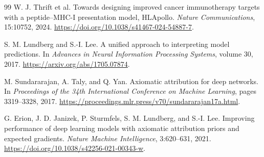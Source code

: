 \begin{thebibliography}{99}
W. J. Thrift et al.
\newblock Towards designing improved cancer immunotherapy targets with a peptide--MHC-I presentation model, HLApollo.
\newblock \emph{Nature Communications}, 15:10752, 2024.
\newblock \url{https://doi.org/10.1038/s41467-024-54887-7}.

S. M. Lundberg and S.-I. Lee.
\newblock A unified approach to interpreting model predictions.
\newblock In \emph{Advances in Neural Information Processing Systems}, volume 30, 2017.
\newblock \url{https://arxiv.org/abs/1705.07874}.

M. Sundararajan, A. Taly, and Q. Yan.
\newblock Axiomatic attribution for deep networks.
\newblock In \emph{Proceedings of the 34th International Conference on Machine Learning}, pages 3319--3328, 2017.
\newblock \url{https://proceedings.mlr.press/v70/sundararajan17a.html}.

G. Erion, J. D. Janizek, P. Sturmfels, S. M. Lundberg, and S.-I. Lee.
\newblock Improving performance of deep learning models with axiomatic attribution priors and expected gradients.
\newblock \emph{Nature Machine Intelligence}, 3:620--631, 2021.
\newblock \url{https://doi.org/10.1038/s42256-021-00343-w}.

\end{thebibliography}
\endgroup
